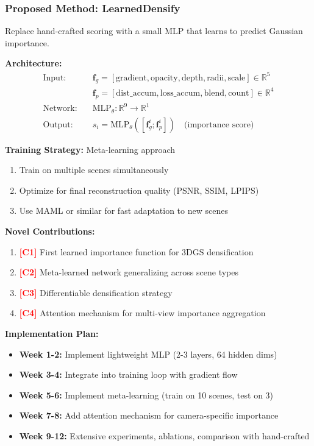 \documentclass[11pt,letterpaper]{article}
\newcommand{\method}[1]{\textbf{#1}}
\newcommand{\contribution}[1]{\textcolor{red}{\textbf{[#1]}}}
\begin{document}
\subsubsection{Proposed Method: \method{LearnedDensify}}

Replace hand-crafted scoring with a small MLP that learns to predict Gaussian importance.

\textbf{Architecture:}
\begin{align*}
\text{Input:} \quad &\mathbf{f}_g = [\text{gradient}, \text{opacity}, \text{depth}, \text{radii}, \text{scale}] \in \mathbb{R}^5 \\
&\mathbf{f}_p = [\text{dist\_accum}, \text{loss\_accum}, \text{blend}, \text{count}] \in \mathbb{R}^4 \\
\text{Network:} \quad &\text{MLP}_\theta: \mathbb{R}^9 \rightarrow \mathbb{R}^1 \\
\text{Output:} \quad &s_i = \text{MLP}_\theta([\mathbf{f}_g^i; \mathbf{f}_p^i]) \quad \text{(importance score)}
\end{align*}

\textbf{Training Strategy:} Meta-learning approach
\begin{enumerate}[leftmargin=*]
    \item Train on multiple scenes simultaneously
    \item Optimize for final reconstruction quality (PSNR, SSIM, LPIPS)
    \item Use MAML or similar for fast adaptation to new scenes
\end{enumerate}

\textbf{Novel Contributions:}
\begin{enumerate}[leftmargin=*]
    \item \contribution{C1} First learned importance function for 3DGS densification
    \item \contribution{C2} Meta-learned network generalizing across scene types
    \item \contribution{C3} Differentiable densification strategy
    \item \contribution{C4} Attention mechanism for multi-view importance aggregation
\end{enumerate}

\textbf{Implementation Plan:}
\begin{itemize}[leftmargin=*]
    \item \textbf{Week 1-2:} Implement lightweight MLP (2-3 layers, 64 hidden dims)
    \item \textbf{Week 3-4:} Integrate into training loop with gradient flow
    \item \textbf{Week 5-6:} Implement meta-learning (train on 10 scenes, test on 3)
    \item \textbf{Week 7-8:} Add attention mechanism for camera-specific importance
    \item \textbf{Week 9-12:} Extensive experiments, ablations, comparison with hand-crafted
\end{itemize}
\end{document}
